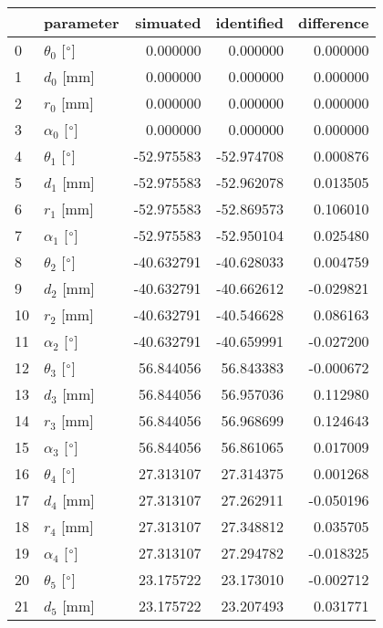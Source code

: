 \documentclass{standalone}%
\begin{document}
%
\normalsize%
\begin{tabular}{llrrr}
\toprule
{} &                 parameter &   simuated & identified & difference \\
\midrule
0  &  $\theta_{0}$ [$\degree$] &   0.000000 &   0.000000 &   0.000000 \\
1  &              $d_{0}$ [mm] &   0.000000 &   0.000000 &   0.000000 \\
2  &              $r_{0}$ [mm] &   0.000000 &   0.000000 &   0.000000 \\
3  &  $\alpha_{0}$ [$\degree$] &   0.000000 &   0.000000 &   0.000000 \\
4  &  $\theta_{1}$ [$\degree$] & -52.975583 & -52.974708 &   0.000876 \\
5  &              $d_{1}$ [mm] & -52.975583 & -52.962078 &   0.013505 \\
6  &              $r_{1}$ [mm] & -52.975583 & -52.869573 &   0.106010 \\
7  &  $\alpha_{1}$ [$\degree$] & -52.975583 & -52.950104 &   0.025480 \\
8  &  $\theta_{2}$ [$\degree$] & -40.632791 & -40.628033 &   0.004759 \\
9  &              $d_{2}$ [mm] & -40.632791 & -40.662612 &  -0.029821 \\
10 &              $r_{2}$ [mm] & -40.632791 & -40.546628 &   0.086163 \\
11 &  $\alpha_{2}$ [$\degree$] & -40.632791 & -40.659991 &  -0.027200 \\
12 &  $\theta_{3}$ [$\degree$] &  56.844056 &  56.843383 &  -0.000672 \\
13 &              $d_{3}$ [mm] &  56.844056 &  56.957036 &   0.112980 \\
14 &              $r_{3}$ [mm] &  56.844056 &  56.968699 &   0.124643 \\
15 &  $\alpha_{3}$ [$\degree$] &  56.844056 &  56.861065 &   0.017009 \\
16 &  $\theta_{4}$ [$\degree$] &  27.313107 &  27.314375 &   0.001268 \\
17 &              $d_{4}$ [mm] &  27.313107 &  27.262911 &  -0.050196 \\
18 &              $r_{4}$ [mm] &  27.313107 &  27.348812 &   0.035705 \\
19 &  $\alpha_{4}$ [$\degree$] &  27.313107 &  27.294782 &  -0.018325 \\
20 &  $\theta_{5}$ [$\degree$] &  23.175722 &  23.173010 &  -0.002712 \\
21 &              $d_{5}$ [mm] &  23.175722 &  23.207493 &   0.031771 \\

\end{tabular}
\end{document}
